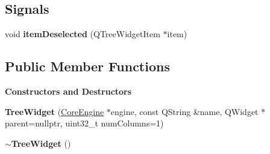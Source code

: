 \subsection*{Signals}
\begin{DoxyCompactItemize}
\item 
\mbox{\label{classrev_1_1_view_1_1_tree_widget_a4e17e8322a5a809b71a9a16a94608e27}} 
void {\bfseries item\+Deselected} (Q\+Tree\+Widget\+Item $\ast$item)
\end{DoxyCompactItemize}
\subsection*{Public Member Functions}
\begin{Indent}\textbf{ Constructors and Destructors}\par
\begin{DoxyCompactItemize}
\item 
\mbox{\label{classrev_1_1_view_1_1_tree_widget_a0da9f3576b12851ace4a9328064a16f7}} 
{\bfseries Tree\+Widget} (\mbox{\hyperlink{classrev_1_1_core_engine}{Core\+Engine}} $\ast$engine, const Q\+String \&name, Q\+Widget $\ast$parent=nullptr, uint32\+\_\+t num\+Columns=1)
\item 
\mbox{\label{classrev_1_1_view_1_1_tree_widget_a414db53e66d71a7dee9bc1ae579bf691}} 
{\bfseries $\sim$\+Tree\+Widget} ()
\end{DoxyCompactItemize}
\end{Indent}
